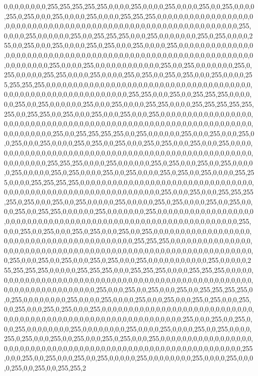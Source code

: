 \begin{DoxyCompactItemize}
0,0,0,0,0,0,0,0,255,255,255,255,255,0,0,0,0,255,0,0,0,0,255,0,0,0,0,255,0,0,255,0,0,0,0,255,0,255,0,0,0,255,0,0,0,0,255,0,0,0,0,255,255,255,0,0,0,0,0,0,0,0,0,0,0,0,0,0,0,0,0,0,0,0,0,0,0,0,0,0,0,0,0,0,0,0,0,0,0,0,0,0,0,0,0,0,0,0,0,0,0,0,0,0,0,0,0,0,0,0,0,0,0,0,0,255,0,0,0,0,255,0,0,0,0,0,0,255,0,0,255,255,255,0,0,0,255,0,0,0,0,0,0,0,255,0,255,0,0,0,0,255,0,0,255,0,0,0,255,0,0,0,0,255,0,255,0,0,0,255,0,0,0,0,255,0,0,0,0,0,0,0,0,0,0,0,0,0,0,0,0,0,0,0,0,0,0,0,0,0,0,0,0,0,0,0,0,0,0,0,0,0,0,0,0,0,0,0,0,0,0,0,0,0,0,0,0,0,0,0,0,0,0,0,0,0,0,0,0,0,0,0,0,255,0,0,0,0,255,0,0,0,0,0,0,0,0,0,0,0,0,255,0,0,255,0,0,0,0,0,0,0,255,0,255,0,0,0,0,0,255,255,0,0,0,0,255,0,0,0,0,255,0,255,0,0,255,0,255,0,0,0,255,0,0,0,0,255,255,255,255,0,0,0,0,0,0,0,0,0,0,0,0,0,0,0,0,0,0,0,0,0,0,0,0,0,0,0,0,0,0,0,0,0,0,0,0,0,0,0,0,0,0,0,0,0,0,0,0,0,0,0,0,0,0,0,0,0,0,0,0,0,255,255,0,0,0,255,0,0,255,255,255,0,0,0,0,0,0,255,0,0,255,0,0,0,0,0,0,255,0,0,0,255,0,0,0,0,255,255,0,0,0,0,255,255,255,255,255,255,0,0,255,255,0,0,255,0,0,0,255,0,0,0,255,0,0,0,255,0,0,0,0,0,0,0,0,0,0,0,0,0,0,0,0,0,0,0,0,0,0,0,0,0,0,0,0,0,0,0,0,0,0,0,0,0,0,0,0,0,0,0,0,0,0,0,0,0,0,0,0,0,0,0,0,0,0,0,0,0,0,0,0,0,0,0,0,0,0,0,0,255,0,0,255,255,255,255,0,0,255,0,0,0,0,0,0,255,0,0,0,255,0,0,0,255,0,0,255,0,0,0,255,0,0,0,0,255,0,255,0,0,255,0,0,0,255,0,255,0,0,0,255,0,0,0,255,0,0,0,0,0,0,0,0,0,0,0,0,0,0,0,0,0,0,0,0,0,0,0,0,0,0,0,0,0,0,0,0,0,0,0,0,0,0,0,0,0,0,0,0,0,0,0,0,0,0,0,0,0,0,0,0,0,0,255,255,255,0,0,0,0,255,0,0,0,0,0,0,255,0,255,0,0,0,255,0,0,255,0,0,0,0,0,255,0,0,0,0,0,255,0,255,0,0,0,0,255,0,0,255,0,0,0,0,255,0,255,0,0,255,0,0,0,0,255,255,0,0,0,0,255,255,255,255,0,0,0,0,0,0,0,0,0,0,0,0,0,0,0,0,0,0,0,0,0,0,0,0,0,0,0,0,0,0,0,0,0,0,0,0,0,0,0,0,0,0,0,0,0,0,0,0,0,0,0,0,0,0,0,0,0,0,0,0,0,255,0,0,0,255,0,0,0,255,255,255,255,0,255,0,0,0,255,0,0,255,0,0,0,0,0,255,0,0,0,0,0,255,0,255,0,0,0,0,255,0,0,255,0,0,0,0,255,0,0,255,255,0,0,0,0,0,0,255,0,0,0,0,0,0,0,255,0,0,0,0,0,0,0,0,0,0,0,0,0,0,0,0,0,0,0,0,0,0,0,0,0,0,0,0,0,0,0,0,0,0,0,0,0,0,0,0,0,0,0,0,0,0,0,0,0,0,0,0,0,0,0,0,0,0,0,0,0,255,0,0,0,255,0,0,255,0,0,0,255,0,255,0,0,0,255,0,0,255,0,0,0,0,0,0,0,0,0,0,0,0,0,0,0,0,0,0,0,0,0,0,0,0,0,0,0,0,0,0,0,0,0,0,0,0,0,0,0,0,0,0,255,255,255,0,0,0,0,0,0,0,0,0,0,0,0,0,0,0,0,0,0,0,0,0,0,0,0,0,0,0,0,0,0,0,0,0,0,0,0,0,0,0,0,0,0,0,0,0,0,0,0,0,0,0,0,0,0,0,0,0,0,0,0,0,0,255,0,0,0,255,0,0,255,0,0,0,255,0,255,0,0,0,255,0,0,0,0,0,0,0,0,0,0,0,255,0,0,0,0,0,255,255,255,255,0,0,0,0,0,255,255,255,0,0,0,255,255,255,0,0,0,0,255,255,255,0,0,0,0,0,0,0,0,0,0,0,0,0,0,0,0,0,0,0,0,0,0,0,0,0,0,0,0,0,0,0,0,0,0,0,0,0,0,0,0,0,0,0,0,0,0,0,0,0,0,0,0,0,0,0,0,0,0,0,0,0,0,0,0,0,0,0,0,255,0,0,0,255,0,0,255,0,0,0,255,0,0,255,255,255,255,0,0,255,0,0,0,0,0,0,0,0,255,0,0,0,0,255,0,0,0,0,255,0,0,0,255,0,0,0,255,0,255,0,0,0,255,0,0,255,0,0,0,255,0,255,0,0,0,255,0,0,0,0,0,0,0,0,0,0,0,0,0,0,0,0,0,0,0,0,0,0,0,0,0,0,0,0,0,0,0,0,0,0,0,0,0,0,0,0,0,0,0,0,0,0,0,0,0,0,0,0,0,0,0,0,0,0,0,0,0,255,0,0,0,255,0,0,255,0,0,0,255,0,0,0,0,0,0,0,0,255,0,0,0,0,0,0,0,0,255,0,0,0,0,255,0,0,0,0,255,0,0,255,0,0,0,0,255,0,255,0,0,0,255,0,0,255,0,0,0,255,0,255,0,0,0,255,0,0,0,0,0,0,0,0,0,0,0,0,0,0,0,0,0,0,0,0,0,0,0,0,0,0,0,0,0,0,0,0,0,0,0,0,0,0,0,0,0,0,0,0,0,0,0,0,0,0,0,0,0,0,0,0,0,0,0,0,0,255,0,0,0,255,0,0,255,0,0,0,255,0,0,255,0,0,0,0,0,255,0,0,0,0,0,0,0,0,255,0,0,0,0,255,0,0,0,0,255,0,0,255,0,0,255,255,2
\end{DoxyCompactItemize}

